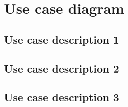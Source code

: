 \section{Use case diagram}

\subsection{Use case description 1}
\subsection{Use case description 2}
\subsection{Use case description 3}